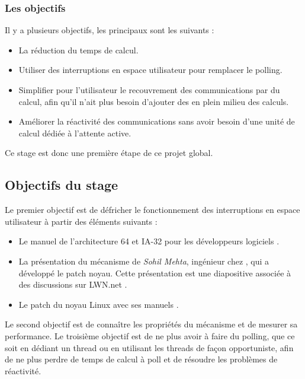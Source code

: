 \subsubsection{Les objectifs}

Il y a plusieurs objectifs, les principaux sont les suivants :

\begin{itemize}
  \item La réduction du temps de calcul.
  \item Utiliser des interruptions en espace utilisateur pour remplacer le polling.
  \item Simplifier pour l'utilisateur le recouvrement des communications par du calcul, afin qu'il n'ait plus besoin d'ajouter des  en plein milieu des calculs.
  \item Améliorer la réactivité des communications sans avoir besoin d'une unité de calcul dédiée à l'attente active.
\end{itemize}

Ce stage est donc une première étape de ce projet global.

\subsection{Objectifs du stage}

Le premier objectif est de défricher le fonctionnement des interruptions en espace utilisateur à partir des éléments suivants :
\begin{itemize}
  \item Le manuel \intel{} de l'architecture 64 et IA-32 pour les développeurs logiciels \cite{intelSoftwareDevMan}.
  \item La présentation du mécanisme de \emph{Sohil Mehta}, ingénieur chez \intel{}, qui a développé le patch noyau. Cette présentation est une diapositive associée à des discussions sur LWN.net \cite{uintrLWN}.
  \item Le patch du noyau Linux \cite{intelUintrLinuxKernel} avec ses manuels \cite{intelUintrLinuxKernelMan}.
\end{itemize}

Le second objectif est de connaître les propriétés du mécanisme et de mesurer sa performance.
Le troisième objectif est de ne plus avoir à faire du polling,
que ce soit en dédiant un thread ou en utilisant les threads de façon opportuniste,
afin de ne plus perdre de temps de calcul à poll et de résoudre les problèmes de réactivité.

